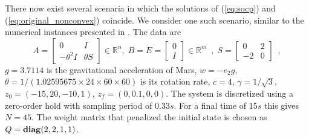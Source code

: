 \documentclass[openany]{now}
\newcommand{\reals}{{\mathbb R}}
\newcommand{\diag}{\mathop{\bf diag}}
\begin{document}
There now exist several scenaria in which the solutions of (\ref{eq:socp}) and (\ref{eq:original_nonconvex}) coincide. We consider one such scenario, similar to the numerical instances presented in \cite[Section~5]{planetary_landing}. The data are 
\[
A = \left[\begin{array}{cc} 0&I\\-\theta^2I&\theta S\end{array}\right]\in\reals^n, \; B = E = \left[\begin{array}{c} 0\\I\end{array}\right]\in\reals^m\enspace, \; S = \left[\begin{array}{cc} 0&2\\-2&0\end{array}\right]\enspace,
\]
$g=3.7114$ is the gravitational acceleration of Mars, $w=-e_2g$, $\theta=1/(1.02595675 \times24\times60\times60)$ is its rotation rate, $c=4$, $\gamma=1/\sqrt{3}$, $z_0=(-15, 20,-10, 1)$, $z_f=(0, 0.1,0, 0)$.
The system is discretized using a zero-order hold with sampling period of $0.33 s$. For a final time of $15 s$ this gives $N=45$. The weight matrix that penalized the initial state is chosen as $Q=\diag(2,2,1,1)$. \\
\end{document}
